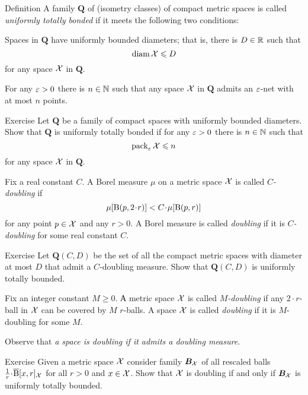 \begin{thm}{Definition}\label{def:utb}
A family $\bm{Q}$ of (isometry classes) of compact metric spaces is called  \emph{uniformly totally bonded} if it meets the following two conditions:

\begin{subthm}{}
Spaces in $\bm{Q}$ have uniformly bounded diameters; that is, there is $D\in\mathbb{R}$ such that
\[\operatorname{\rm diam}\nolimits\mathcal{X}\leqslant D\]
for any space $\mathcal{X}$ in $\bm{Q}$.
\end{subthm}

\begin{subthm}{}
For any $\varepsilon>0$ there is $n\in\mathbb{N}$ such that any space $\mathcal{X}$ in $\bm{Q}$ admits an $\varepsilon$-net with at most $n$ points.
\end{subthm}
\end{thm}

\begin{thm}{Exercise}\label{ex:utb+pack}
Let $\bm{Q}$ be a family of compact spaces with uniformly bounded diameters.
Show that $\bm{Q}$ is uniformly totally bonded if for any $\varepsilon>0$ there is $n\in\mathbb{N}$ such that 
\[\operatorname{\rm pack}\nolimits_\varepsilon\mathcal{X}\leqslant n\]
for any space $\mathcal{X}$ in $\bm{Q}$.
\end{thm}


Fix a real constant $C$.
A Borel measure $\mu$ on a metric space $\mathcal{X}$ is called {}\emph{$C$-doubling} if
\[\mu[\oBall(p,2\cdot r)]< C\cdot\mu[\oBall(p,r)]\]
for any point $p\in \mathcal{X}$ and any $r>0$.
A Borel measure is called \emph{doubling} if it is {}\emph{$C$-doubling} for some real constant $C$.

\begin{thm}{Exercise}\label{pr:doubling}
Let $\bm{Q}(C,D)$ be the set of all the compact metric spaces with diameter at most $D$ that admit a $C$-doubling measure.
Show that $\bm{Q}(C,D)$ is uniformly totally bounded.
\end{thm}

Fix an integer constant $M\ge 0$.
А metric space $\mathcal{X}$ is called {}\emph{$M$-doubling} if any $2\cdot r$-ball in $\mathcal{X}$ can be covered by $M$ $r$-balls.
A space $\mathcal{X}$ is called \emph{doubling} if it is $M$-doubling for some $M$.

Observe that \textit{a space is doubling if it admits a doubling measure}.

\begin{thm}{Exercise}\label{ex:pointed-doubling}
Given a metric space $\mathcal{X}$ consider family $\bm{B}_{\mathcal{X}}$ of all rescaled balls $\tfrac1r\cdot \cBall[x,r]_{\spc{X}}$ for all $r>0$ and $x\in\mathcal{X}$. 
Show that $\mathcal{X}$ is doubling if and only if $\bm{B}_{\mathcal{X}}$ is uniformly totally bounded.
\end{thm}


